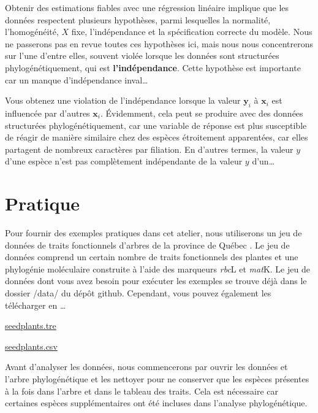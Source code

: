 \documentclass[
]{book}
\begin{document}
Obtenir des estimations fiables avec une régression linéaire implique que les données respectent plusieurs hypothèses, parmi lesquelles la normalité, l'homogénéité, \(X\) fixe, l'indépendance et la spécification correcte du modèle. Nous ne passerons pas en revue toutes ces hypothèses ici, mais nous nous concentrerons sur l'une d'entre elles, souvent violée lorsque les données sont structurées phylogénétiquement, qui est \textbf{l'indépendance}. Cette hypothèse est importante car un manque d'indépendance inval\ldots{}

Vous obtenez une violation de l'indépendance lorsque la valeur \(\textbf{y}_i\) à \(\textbf{x}_i\) est influencée par d'autres \(\textbf{x}_i\). Évidemment, cela peut se produire avec des données structurées phylogénétiquement, car une variable de réponse est plus susceptible de réagir de manière similaire chez des espèces étroitement apparentées, car elles partagent de nombreux caractères par filiation. En d'autres termes, la valeur \(y\) d'une espèce n'est pas complètement indépendante de la valeur \(y\) d'un\ldots{}

\section{Pratique}\label{pratique}

Pour fournir des exemples pratiques dans cet atelier, nous utiliserons un jeu de données de traits fonctionnels d'arbres de la province de Québec \citep{paquette2015explaining}. Le jeu de données comprend un certain nombre de traits fonctionnels des plantes et une phylogénie moléculaire construite à l'aide des marqueurs \emph{rbc}L et \emph{mat}K. Le jeu de données dont vous avez besoin pour exécuter les exemples se trouve déjà dans le dossier /data/ du dépôt github. Cependant, vous pouvez également les télécharger en \ldots{}

\href{https://simjoly.github.io/ComparativeMethods-HalfDayWorkshop/data/seedplants.tre}{seedplants.tre}

\href{https://simjoly.github.io/ComparativeMethods-HalfDayWorkshop/data/seedplants.csv}{seedplants.csv}

Avant d'analyser les données, nous commencerons par ouvrir les données et l'arbre phylogénétique et les nettoyer pour ne conserver que les espèces présentes à la fois dans l'arbre et dans le tableau des traits. Cela est nécessaire car certaines espèces supplémentaires ont été incluses dans l'analyse phylogénétique.
\end{document}
